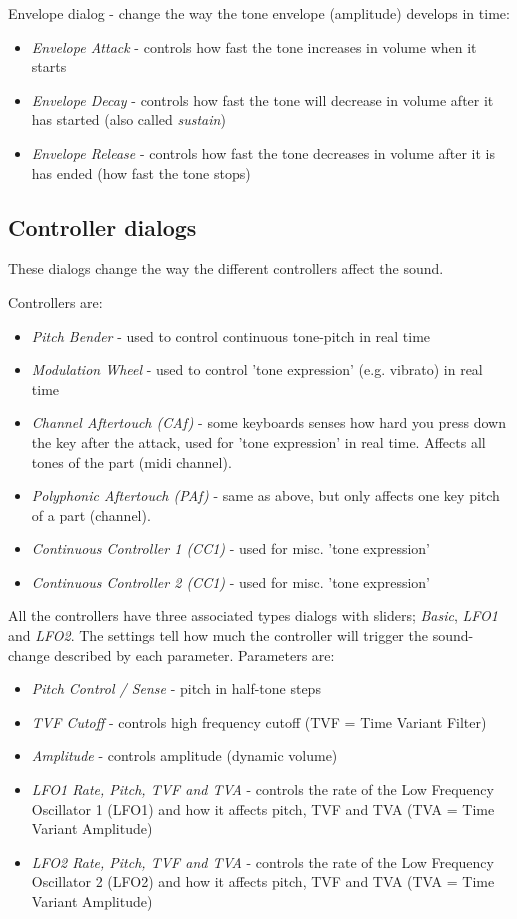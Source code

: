 \documentclass[letterpaper]{report}
\begin{document}
Envelope dialog - change the way the tone envelope (amplitude) develops in
time:

\begin{itemize}
\item {\em Envelope Attack} - controls how fast the tone increases in volume
when it starts
\item {\em Envelope Decay} - controls how fast the tone will
decrease in volume after it has started (also called {\em sustain})
\item {\em Envelope Release} - controls how fast the tone decreases in volume
after it is has ended (how fast the tone stops)
\end{itemize}

\subsection{Controller dialogs}
These dialogs change the way the different controllers affect the sound.

Controllers are:

\begin{itemize}
\item {\em Pitch Bender} - used to control continuous tone-pitch in real time
\item {\em Modulation Wheel} - used to control 'tone expression'
(e.g. vibrato) in real time
\item {\em Channel Aftertouch (CAf)} - some keyboards senses how hard you
press down the key after the attack, used for 'tone expression' in real
time. Affects all tones of the part (midi channel).
\item {\em Polyphonic Aftertouch (PAf)} - same as above, but only affects
one key pitch of a part (channel).
\item {\em Continuous Controller 1 (CC1)} - used for misc. 'tone expression'
\item {\em Continuous Controller 2 (CC1)} - used for misc. 'tone expression'
\end{itemize}

All the controllers have three associated types dialogs with sliders;
{\em Basic}, {\em LFO1} and {\em LFO2}.
The settings tell how much the controller will trigger the
sound-change described by each parameter. Parameters are:

\begin{itemize}
\item {\em Pitch Control / Sense} - pitch in half-tone steps
\item {\em TVF Cutoff} - controls high frequency cutoff (TVF =
Time Variant Filter)
\item {\em Amplitude} - controls amplitude (dynamic volume)
\item {\em LFO1 Rate, Pitch, TVF and TVA} - controls the rate of the Low
Frequency Oscillator 1 (LFO1) and how it affects pitch, TVF and TVA (TVA =
Time Variant Amplitude)
\item {\em LFO2 Rate, Pitch, TVF and TVA} - controls the rate of the Low
Frequency Oscillator 2 (LFO2) and how it affects pitch, TVF and TVA (TVA =
Time Variant Amplitude)
\end{itemize}
\end{document}
